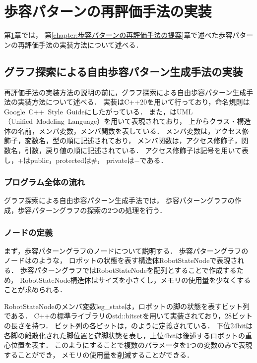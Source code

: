 ﻿%

\chapter{歩容パターンの再評価手法の実装}\label{chapter:歩容パターンの再評価手法の実装}
第\ref{chapter:歩容パターンの再評価手法の実装}章では，
第\ref{chapter:歩容パターンの再評価手法の提案}章で述べた歩容パターンの再評価手法の実装方法について述べる．

\section{グラフ探索による自由歩容パターン生成手法の実装}
再評価手法の実装方法の説明の前に，グラフ探索による自由歩容パターン生成手法の実装方法について述べる．
実装はC++20を用いて行っており，命名規則はGoogle~C++~Style~Guide\cite{cita:google_cpp_style_guide}にしたがっている．
また，はUML（Unified~Modeling~Language）を用いて表現されており，
上からクラス・構造体の名前，メンバ変数，メンバ関数を表している．
メンバ変数は，アクセス修飾子，変数名，型の順に記述されており，
メンバ関数は，アクセス修飾子，関数名，引数，戻り値の順に記述されている．
アクセス修飾子は記号を用いて表し，+はpublic，protectedは\#，
privateは$-$である．

\subsection{プログラム全体の流れ}
グラフ探索による自由歩容パターン生成手法では，
歩容パターングラフの作成，歩容パターングラフの探索の2つの処理を行う．

\subsection{ノードの定義}
まず，歩容パターングラフのノードについて説明する．
歩容パターングラフのノードはのような，
ロボットの状態を表す構造体RobotStateNodeで表現される．
歩容パターングラフではRobotStateNodeを配列とすることで作成するため，
RobotStateNode構造体はサイズを小さくし，メモリの使用量を少なくすることが求められる．

RobotStateNodeのメンバ変数leg\_stateは，ロボットの脚の状態を表すビット列である．
C++の標準ライブラリのstd::bitsetを用いて実装されており，28ビットの長さを持つ．
ビット列の各ビットは，のように定義されている．
下位24bitは各脚の離散化された脚位置と遊脚状態を表し，上位4bitは後述するロボットの重心位置を表す．
このようにすることで複数のパラメータを1つの変数のみで表現することができ，
メモリの使用量を削減することができる．

